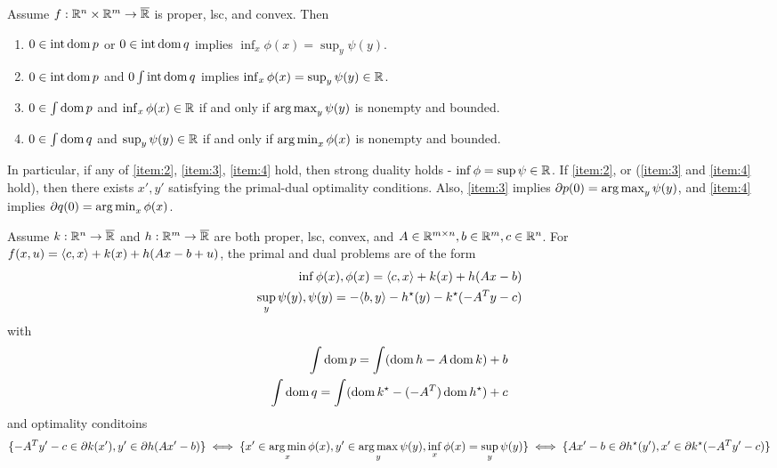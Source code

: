 \begin{thm}
  \label{sec:duality-optimization-6}
  Assume $f: \mathbb{R}^{n} \times \mathbb{R}^{m} \rightarrow \overline {\mathbb{R}}$ is proper,
  lsc, and convex. Then
  \begin{enumerate}
  \item\label{item:1} $0 \in \operatorname*{int} \operatorname*{dom} p$ or $0 \in \operatorname*{int} \operatorname*{dom} q$ implies
    $\inf_{x} \phi(x) = \sup_{y} \psi(y)$.
  \item\label{item:2} $0 \in \operatorname*{int} \operatorname*{dom} p$ and $0 \int \operatorname*{int} \operatorname*{dom} q$ implies
    $\inf_{x} \phi(x) = \sup_{y} \psi(y) \in \mathbb{R}$.
  \item\label{item:3} $0 \in \int \operatorname*{dom} p$ and $\inf_{x} \phi(x) \in \mathbb{R}$ if and only
    if $\operatorname*{arg\,max}_{y} \psi(y)$ is nonempty and bounded.
  \item\label{item:4} $0 \in \int \operatorname*{dom} q$ and $\sup_{y} \psi(y) \in \mathbb{R}$ if and only
    if $\operatorname*{arg\,min}_{x} \phi(x)$ is nonempty and bounded.
  \end{enumerate}
  In particular, if any of \ref{item:2}, \ref{item:3}, \ref{item:4}
  hold, then strong duality holds - $\inf \phi = \sup \psi \in \mathbb{R}$.
  If \ref{item:2}, or (\ref{item:3} and \ref{item:4} hold), then there
  exists $x', y'$ satisfying the primal-dual optimality conditions.
  Also, \ref{item:3} implies $\partial p(0) = \operatorname*{arg\,max}_{y} \psi(y)$,
  and \ref{item:4} implies $\partial q(0) = \operatorname*{arg\,min}_{x} \phi(x)$.
\end{thm}

\begin{thm}
  \label{sec:duality-optimization-7}
  Assume $k: \mathbb{R}^{n} \rightarrow \overline {\mathbb{R}}$ and $h: \mathbb{R}^{m}
  \rightarrow \overline {\mathbb{R}}$ are both proper, lsc, convex, and $A \in
  \mathbb{R}^{m \times n}, b \in \mathbb{R}^{m}, c \in \mathbb{R}^{n}$.  For $f(x, u) = \IP{c,
  x} + k(x) + h(Ax - b + u)$, the primal and dual problems are of the
form
\begin{align}
  \label{eq:43}
  \inf \phi(x), \phi(x) = \IP{c, x} + k(x) + h(Ax - b) \\
  \label{eq:44}
  \sup_{y} \psi(y), \psi(y) = -\IP{b, y} - h^{\star}(y) -
  k^{\star}(-A^{T}y - c)
\end{align} with
\begin{align}
  \label{eq:45}
  \int \operatorname*{dom} p = \int (\operatorname*{dom} h - A \operatorname*{dom} k) + b \\
  \label{eq:46}
  \int \operatorname*{dom} q = \int(\operatorname*{dom} k^{\star} - (-A^{T}) \operatorname*{dom} h^{\star}) + c
\end{align}
and optimality conditoins
\begin{align}
  \label{eq:47}
  \{ -A^{T} y' - c \in \partial k(x'), y' \in \partial h(Ax' - b) \}
  \iff \{ x' \in \operatorname*{arg\,min}_{x} \phi(x), y' \in \operatorname*{arg\,max}_{y} \psi(y),
  \inf_{x} \phi(x) = \sup_{y} \psi(y) \} \iff \{ Ax' - b \in \partial
  h^{\star}(y'), x' \in \partial k^{\star}(-A^{T} y' - c) \} 
\end{align}
\end{thm}

